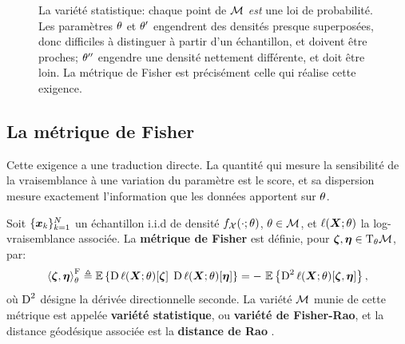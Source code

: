 \begin{figure}
  \centering
  
  \caption{La variété statistique: chaque point de $\mathcal{M}$ \emph{est} une loi
    de probabilité. Les paramètres $\theta$ et $\theta'$ engendrent des densités
    presque superposées, donc difficiles à distinguer à partir d'un échantillon,
    et doivent être proches; $\theta''$ engendre une densité nettement
    différente, et doit être loin. La métrique de Fisher est précisément celle
    qui réalise cette exigence.}
  \label{fig:context-riemann-statistique}
\end{figure}

\subsection{La métrique de Fisher}

Cette exigence a une traduction directe. La quantité qui mesure la sensibilité de la vraisemblance à une variation du paramètre est le score, et sa dispersion mesure exactement l'information que les données apportent sur $\theta$.

\begin{definition}
\label{def:context-geometry-fisher}
  Soit $\{\boldsymbol{x}_k\}_{k=1}^N$ un échantillon i.i.d de densité $f_{\mathcal{X}}(\cdot;\theta)$, $\theta\in\mathcal{M}$, et $\ell(\boldsymbol{X};\theta)$ la log-vraisemblance associée. La \textbf{métrique de Fisher} est définie, pour $\boldsymbol{\zeta},\boldsymbol{\eta}\in\mathrm{T}_{\theta}\mathcal{M}$, par:
  \begin{equation}
    \left\langle \boldsymbol{\zeta}, \boldsymbol{\eta} \right\rangle_{\theta}^{\mathrm{F}}
    \triangleq
    \operatorname{\mathbb{E}}\left\{
      \operatorname{\mathrm{D}}\ell(\boldsymbol{X};\theta)[\boldsymbol{\zeta}]\;
      \operatorname{\mathrm{D}}\ell(\boldsymbol{X};\theta)[\boldsymbol{\eta}]
    \right\}
    =
    -\,\operatorname{\mathbb{E}}\left\{
      \operatorname{\mathrm{D}}^2\ell(\boldsymbol{X};\theta)[\boldsymbol{\zeta},\boldsymbol{\eta}]
    \right\},
    \label{eq:context-geometry-fisher}
  \end{equation}
  où $\operatorname{\mathrm{D}}^2$ désigne la dérivée directionnelle seconde. La variété $\mathcal{M}$ munie de cette métrique est appelée \textbf{variété statistique}, ou \textbf{variété de Fisher-Rao}, et la distance géodésique associée est la \textbf{distance de Rao} .
\end{definition}

